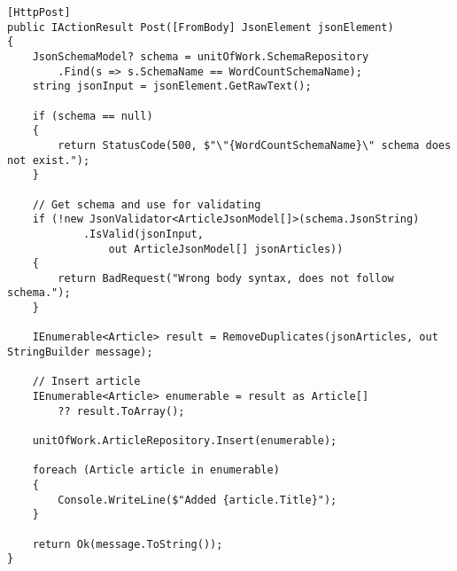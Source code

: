 \begin{lstlisting}[language=CSharp, caption={New controller}, label={lst:new_controller}]
[HttpPost]
public IActionResult Post([FromBody] JsonElement jsonElement)
{
    JsonSchemaModel? schema = unitOfWork.SchemaRepository
        .Find(s => s.SchemaName == WordCountSchemaName);
    string jsonInput = jsonElement.GetRawText();

    if (schema == null)
    {
        return StatusCode(500, $"\"{WordCountSchemaName}\" schema does not exist.");
    }

    // Get schema and use for validating
    if (!new JsonValidator<ArticleJsonModel[]>(schema.JsonString)
            .IsValid(jsonInput, 
                out ArticleJsonModel[] jsonArticles))
    {
        return BadRequest("Wrong body syntax, does not follow schema.");
    }

    IEnumerable<Article> result = RemoveDuplicates(jsonArticles, out StringBuilder message);

    // Insert article
    IEnumerable<Article> enumerable = result as Article[] 
        ?? result.ToArray();

    unitOfWork.ArticleRepository.Insert(enumerable);

    foreach (Article article in enumerable)
    {
        Console.WriteLine($"Added {article.Title}");
    }

    return Ok(message.ToString());
}
\end{lstlisting}
